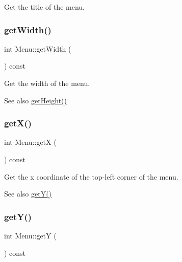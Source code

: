 Get the title of the menu. 

\mbox{\label{class_menu_a993d925b955146c9e265d16df1371f51}} 
\subsubsection{\texorpdfstring{get\+Width()}{getWidth()}}
{\footnotesize\ttfamily int Menu\+::get\+Width (\begin{DoxyParamCaption}{ }\end{DoxyParamCaption}) const\hspace{0.3cm}{\ttfamily [inline]}}



Get the width of the menu. 

\begin{DoxySeeAlso}{See also}
\mbox{\hyperlink{class_menu_a67f414acad54c237dc321a28b6ca723a}{get\+Height()}} 
\end{DoxySeeAlso}
\mbox{\label{class_menu_a75345bb25315b3cbcc98ad276e043f4d}} 
\subsubsection{\texorpdfstring{get\+X()}{getX()}}
{\footnotesize\ttfamily int Menu\+::getX (\begin{DoxyParamCaption}{ }\end{DoxyParamCaption}) const\hspace{0.3cm}{\ttfamily [inline]}}



Get the x coordinate of the top-\/left corner of the menu. 

\begin{DoxySeeAlso}{See also}
\mbox{\hyperlink{class_menu_a2daa248a3bc22bfbd0931337ea8299ae}{get\+Y()}} 
\end{DoxySeeAlso}
\mbox{\label{class_menu_a2daa248a3bc22bfbd0931337ea8299ae}} 
\subsubsection{\texorpdfstring{get\+Y()}{getY()}}
{\footnotesize\ttfamily int Menu\+::getY (\begin{DoxyParamCaption}{ }\end{DoxyParamCaption}) const\hspace{0.3cm}{\ttfamily [inline]}}



